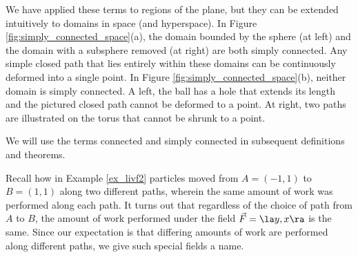 We have applied these terms to regions of the plane, but they can be extended intuitively to domains in space (and hyperspace). In Figure \ref{fig:simply_connected_space}(a), the domain bounded by the sphere (at left) and the domain with a subsphere removed (at right) are both simply connected. Any simple closed path that lies entirely within these domains can be continuously deformed into a single point. In Figure \ref{fig:simply_connected_space}(b), neither domain is simply connected. A left, the ball has a hole that extends its length and the pictured closed path cannot be deformed to a point. At right, two paths are illustrated on the torus that cannot be shrunk to a point. 

We will use the terms connected and simply connected in subsequent definitions and theorems.



Recall how in Example \ref{ex_livf2} particles moved from $A = (-1,1)$ to $B = (1,1)$ along two different paths, wherein the same amount of work was performed along each path. It turns out that regardless of the choice of path from $A$ to $B$, the amount of work performed under the field $\vec F = \la y, x\ra$ is the same. Since our expectation is that differing amounts of work are performed along different paths, we give such special fields a name. %

